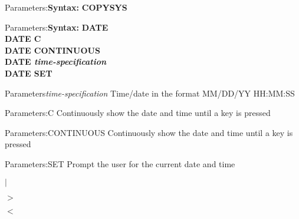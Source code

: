 \documentclass[11pt]{book}
\def\lthtmlcheckvsize{\ifdim\ht\sizebox<\vsize 
  \ifdim\wd\sizebox<\hsize\expandafter\hfill\fi \expandafter\vfill
  \else\expandafter\vss\fi}%
\begin{document}
{\newpage\clearpage
{}%
\begin{labeledpar}{Parameters:}{\textbf{Syntax:}}
\textbf{COPYSYS}
\end{labeledpar}%
\lthtmlfigureZ
\lthtmlcheckvsize\clearpage}

{\newpage\clearpage
{}%
\begin{labeledpar}{Parameters:}{\textbf{Syntax:}}
\textbf{DATE}\\
\textbf{DATE C}\\
\textbf{DATE CONTINUOUS}\\
\textbf{DATE \textit{time-specification}}\\
\textbf{DATE SET}
\end{labeledpar}%
\lthtmlfigureZ
\lthtmlcheckvsize\clearpage}

{\newpage\clearpage
{}%
\begin{labeledpar}{Parameters}{\textit{time-specification}}
  Time/date in the format MM/DD/YY HH:MM:SS
\end{labeledpar}%
\lthtmlfigureZ
\lthtmlcheckvsize\clearpage}

{\newpage\clearpage
{}%
\begin{labeledpar}{Parameters:}{C}
  Continuously show the date and time until a key is pressed
\end{labeledpar}%
\lthtmlfigureZ
\lthtmlcheckvsize\clearpage}

{\newpage\clearpage
{}%
\begin{labeledpar}{Parameters:}{CONTINUOUS}
  Continuously show the date and time until a key is pressed
\end{labeledpar}%
\lthtmlfigureZ
\lthtmlcheckvsize\clearpage}

{\newpage\clearpage
{}%
\begin{labeledpar}{Parameters:}{SET}
  Prompt the user for the current date and time
\end{labeledpar}%
\lthtmlfigureZ
\lthtmlcheckvsize\clearpage}

{\newpage\clearpage
{}%
\(|\)%
\lthtmlindisplaymathZ
\lthtmlcheckvsize\clearpage}

{\newpage\clearpage
{}%
\(>\)%
\lthtmlindisplaymathZ
\lthtmlcheckvsize\clearpage}

{\newpage\clearpage
{}%
\(<\)%
\lthtmlindisplaymathZ
\lthtmlcheckvsize\clearpage}
\end{document}
